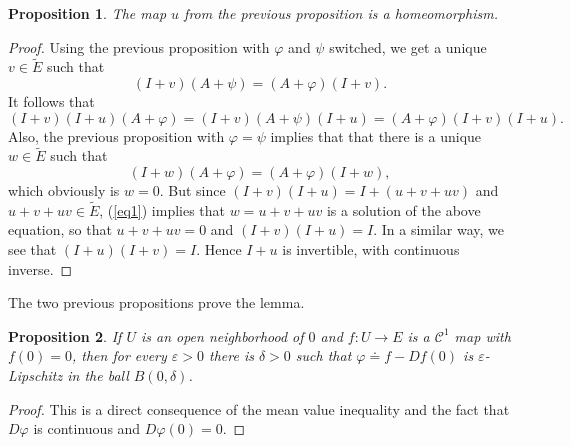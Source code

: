 \documentclass[12pt]{article}
\newtheorem{proposition}{Proposition}
\renewcommand{\phi}{\varphi}
\renewcommand{\epsilon}{\varepsilon}
\begin{document}
\begin{proposition} The map $u$ from the previous proposition is a homeomorphism.
\end{proposition}
\begin{proof} Using the previous proposition with $\phi$ and $\psi$ switched, we get a unique
$v\in \tilde E$ such that
$$(I+v)(A+\psi) = (A+\phi)(I+v).$$
It follows that
\begin{equation}\label{eq1}
(I+v)(I+u)(A+\phi) = (I+v)(A+\psi)(I+u) = (A+\phi)(I+v)(I+u).
\end{equation}
Also, the previous proposition with $\phi = \psi$ implies that
that there is a unique $w\in\tilde E$ such that
$$(I+w)(A+\phi) = (A+\phi)(I+w),$$
which obviously is $w=0$. But since $(I+v)(I+u) = I+(u+v+uv)$ and $u+v+uv\in \tilde E$,
(\ref{eq1}) implies that $w=u+v+uv$ is a solution of the above equation, so that $u+v+uv = 0$ and $(I+v)(I+u) = I$. In a similar way, we see that $(I+u)(I+v)=I$. Hence $I+u$ is invertible, with continuous inverse.
\end{proof}

The two previous propositions prove the lemma.

\begin{proposition} If $U$ is an open neighborhood of $0$ and $f\colon U\to E$
is a $\mathcal{C^1}$ map with $f(0)=0$, then for every $\epsilon>0$ there is $\delta>0$ such that
$\phi\doteq f-Df(0)$ is $\epsilon$-Lipschitz in the ball $B(0,\delta)$.
\end{proposition}
\begin{proof} This is a direct consequence of the mean value inequality and the
fact that $D\phi$ is continuous and $D\phi(0)=0$.
\end{proof}
\end{document}
